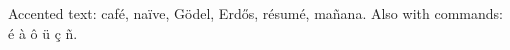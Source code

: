 \documentclass{article}
\begin{document}
Accented text: café, naïve, Gödel, Erdős, résumé, mañana.
Also with commands: \'e \`a \^o \"u \c{c} \~n.
\end{document}
